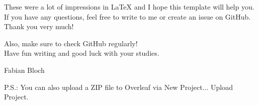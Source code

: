 These were a lot of impressions in \LaTeX{} and I hope this template will help you.\\

If you have any questions, feel free to write to me or create an issue on GitHub. Thank you very much!

Also, make sure to check GitHub regularly!\\

Have fun writing and good luck with your studies.

Fabian Bloch

\vspace{7mm}
\textcolor{HCU}{P.S.: You can also upload a ZIP file to Overleaf via \glqq New Project... Upload Project\grqq{}.}
